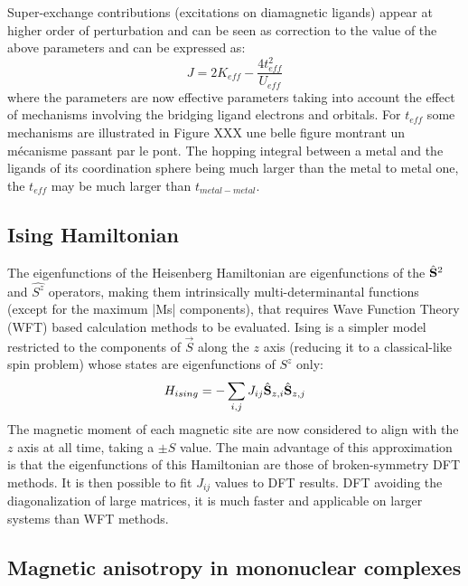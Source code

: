 \documentclass[12pt]{report}
\numberwithin{equation}{section}
\begin{document}
Super-exchange contributions (excitations on diamagnetic ligands) appear at higher order of perturbation and can be seen as correction to the value of the above parameters and can be expressed as:
\begin{equation}
	J=2K_{eff}-\frac{4t_{eff}^2}{U_{eff}}
\end{equation}
where the parameters are now effective parameters taking into account the effect of mechanisms involving the bridging ligand electrons and orbitals. For $t_{eff}$ some mechanisms are illustrated in Figure XXX une belle figure montrant un mécanisme passant par le pont. The hopping integral between a metal and the ligands of its coordination sphere being much larger than the metal to metal one, the $t_{eff}$ may be much larger than $t_{metal-metal}$.

\subsection*{Ising Hamiltonian}

The eigenfunctions of the Heisenberg Hamiltonian are eigenfunctions of the $\hat{\vb S}^2$ and $\hat{S^z}$ operators, making them intrinsically multi-determinantal functions (except for the maximum |Ms| components), that requires Wave Function Theory (WFT) based calculation methods to be evaluated. Ising is a simpler model restricted to the components of $\vec{S}$ along the $z$ axis (reducing it to a classical-like spin problem) whose states are eigenfunctions of $S^z$ only:
\begin{equation}
    H_{ising}=- \sum_{i,j} J_{ij} \hat{\vb S}_{z,i} \hat{\vb S}_{z,j}
\end{equation}
The magnetic moment of each magnetic site are now considered to align with the $z$ axis at all time, taking a $\pm S$ value.
The main advantage of this approximation is that the eigenfunctions of this Hamiltonian are those of broken-symmetry DFT methods.
It is then possible to fit $J_{ij}$ values to DFT results. DFT avoiding the diagonalization of large matrices, it is much faster and applicable on larger systems than WFT methods.

\subsection{Magnetic anisotropy in mononuclear complexes}
\end{document}
